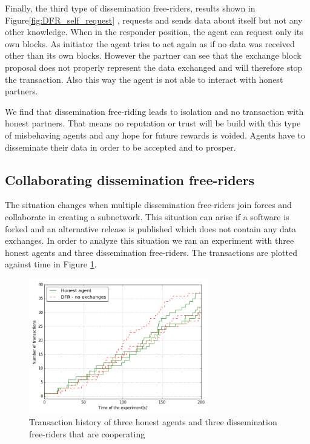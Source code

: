 Finally, the third type of dissemination free-riders, results shown in Figure\ref{fig:DFR_self_request}
, requests and sends data about itself but not any other knowledge. When in the responder position, 
the agent can request only its own blocks. As initiator the agent tries to act again as if no data
was received other than its own blocks. However the partner can see that the exchange block proposal
does not properly represent the data exchanged and will therefore stop the transaction. Also this way
the agent is not able to interact with honest partners. 

We find that dissemination free-riding leads to isolation and no transaction with honest partners. 
That means no reputation or trust will be build with this type of misbehaving agents and any hope for
future rewards is voided. Agents have to disseminate their data in order to be accepted and to prosper.

\subsection{Collaborating dissemination free-riders}
The situation changes when multiple dissemination free-riders join forces and collaborate in creating
a subnetwork. This situation can arise if a software is forked and an alternative release is published
which does not contain any data exchanges. In order to analyze this situation we ran an experiment 
with three honest agents and three dissemination free-riders. The transactions are plotted against 
time in Figure \ref{fig:50percent}.

\begin{figure}[h!]
    \centering
    \includegraphics[width=0.7\textwidth]{images/50percent}
    \caption{Transaction history of three honest agents and three dissemination free-riders
    that are cooperating}
    \label{fig:50percent}
\end{figure}

